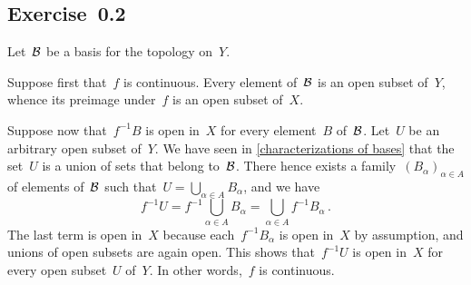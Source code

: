 \subsection{Exercise~0.2}

Let~$\mathcal{B}$ be a basis for the topology on~$Y$.

Suppose first that~$f$ is continuous.
Every element of~$\mathcal{B}$ is an open subset of~$Y$, whence its preimage under~$f$ is an open subset of~$X$.

Suppose now that~$f^{-1} B$ is open in~$X$ for every element~$B$ of~$\mathcal{B}$.
Let~$U$ be an arbitrary open subset of~$Y$.
We have seen in \cref{characterizations of bases} that the set~$U$ is a union of sets that belong to~$\mathcal{B}$.
There hence exists a family~$(B_α)_{α ∈ A}$ of elements of~$\mathcal{B}$ such that~$U = ⋃_{α ∈ A} B_α$, and we have
\[
	f^{-1} U
	=
	f^{-1} ⋃_{α ∈ A} B_α
	=
	⋃_{α ∈ A} f^{-1} B_α \,.
\]
The last term is open in~$X$ because each~$f^{-1} B_α$ is open in~$X$ by assumption, and unions of open subsets are again open.
This shows that~$f^{-1} U$ is open in~$X$ for every open subset~$U$ of~$Y$.
In other words,~$f$ is continuous.
